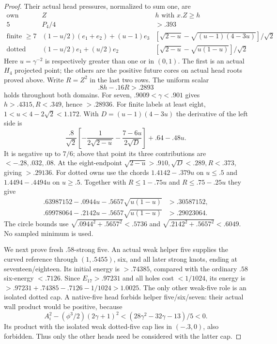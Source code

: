 \documentclass[11pt]{article}
\theoremstyle{definition}
\theoremstyle{remark}
\begin{document}
\begin{proof}
Their actual head pressures, normalized to sum one, are
\[
\begin{array}{c|c|c}
\text{own}&Z&h\text{ with }x.Z\ge h\\\hline
5&P_4/4&>.393\\
\text{finite }\ge7&(1-u/2)(e_1+e_2)+(u-1)e_3&
[\sqrt{2-u}-\sqrt{(u-1)(4-3u)}]/\sqrt2\\
\text{dotted}&(1-u/2)e_1+(u/2)e_2&
[\sqrt{2-u}-\sqrt{u(1-u)}]/\sqrt2
\end{array}
\]
Here $u=\gamma^{-2}$ is respectively greater than one or in
$(0,1)$. The first is an actual $H_4$ projected point; the
others are the positive future cores on actual head roots proved
above. Write $R=Z^2$ in the last two rows. The uniform scalar
\begin{equation}\label{app:tail:eq:B20headscalar}
 .8h-.16R>.2893
\end{equation}
holds throughout both domains. For seven,
$.9009<\gamma<.901$ gives $h>.4315,R<.349$, hence $>.28936$.
For finite labels at least eight, $1<u<4-2\sqrt2<1.172$.
With $D=(u-1)(4-3u)$ the derivative of the left side is
\[
 {\frac{ .8}{\sqrt2}}
 \left[-{\frac{1}{2\sqrt{2-u}}}-{\frac{7-6u}{2\sqrt D}}\right]
                   +.64-.48u.
\]
It is negative up to $7/6$; above that point its three
contributions are $<-.28,.032,.08$. At the eight-endpoint
$\sqrt{2-u}>.910,\sqrt D<.289,R<.373$, giving $>.29136$.
For dotted owns use the chords $1.4142-.379u$ on $u\le.5$
and $1.4494-.4494u$ on $u\ge.5$.
Together with $R\le1-.75u$ and $R\le.75-.25u$ they give
\[
\begin{split}
.63987152-.0944u-.5657\sqrt{u(1-u)}&>.30587152,\\
.69978064-.2142u-.5657\sqrt{u(1-u)}&>.29023064.
\end{split}
\]
The circle bounds use
$\sqrt{.0944^2+.5657^2}<.5736$ and
$\sqrt{.2142^2+.5657^2}<.6049$. No sampled minimum is used.

We next prove fresh $.58$-strong five. An actual weak helper
five supplies the curved reference through $(1,.5455)$, six,
and all later strong knots, ending at seventeen/eighteen.
Its initial energy is $>.74385$, compared with the ordinary
$.58$ six-energy $<.7126$. Since $E_{17}>.97231$ and all
holes cost $<1/1024$, its energy is
$>.97231+.74385-.7126-1/1024>1.0025$.
The only other weak-five role is an isolated dotted cap.
A native-five head forbids helper five/six/seven: their actual
wall product would be positive, because
\[
 A_i^2-(\phi^3/2)(2\gamma+1)^2
       <(28\gamma^2-32\gamma-13)/5<0.
\]
Its product with the isolated weak dotted-five cap lies in
$(-.3,0)$, also forbidden. Thus only the other heads need be
considered with the latter cap.


\end{proof}
\end{document}
